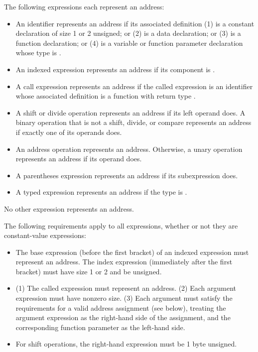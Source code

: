 \documentclass[10pt]{article}
\begin{document}
 The following expressions each represent
an address:
%
\begin{itemize}
%
\item {} An identifier represents an address if its
  associated definition (1) is a constant declaration of size 1 or 2
  unsigned; or (2) is a data declaration; or (3) is a function
  declaration; or (4) is a variable or function parameter declaration
  whose type is .
%
\item {} An indexed expression represents an
  address if its  component is .
%
\item {}  A call expression represents an
  address if the called expression is an identifier whose associated
  definition is a function with return type .
%
\item {} A shift or divide operation
  represents an address if its left operand does.  A binary operation
  that is not a shift, divide, or compare represents an address if
  exactly one of its operands does.
%
\item {} An address operation
   represents an address.  Otherwise, a unary operation
  represents an address if its operand does.
%
\item {} A parentheses expression
  represents an address if its subexpression does.
%
\item {} A typed expression represents an
  address if the type is .
%
\end{itemize}
%
No other expression represents an address.

The following requirements apply to all expressions, whether or not
they are constant-value expressions:
%
\begin{itemize}
%
\item {} The base expression (before the
  first bracket) of an indexed expression must represent an address.
  The index expression (immediately after the first bracket) must have
  size 1 or 2 and be unsigned.
%
\item {} (1) The called expression must
  represent an address.  (2) Each argument expression must have
  nonzero size. (3) Each argument must satisfy the requirements for a
  valid address assignment (see below), treating the argument
  expression as the right-hand side of the assignment, and the
  corresponding function parameter as the left-hand side.
%
\item {}  For shift operations,
  the right-hand expression must be 1 byte unsigned.
%
\end{itemize}
\end{document}
